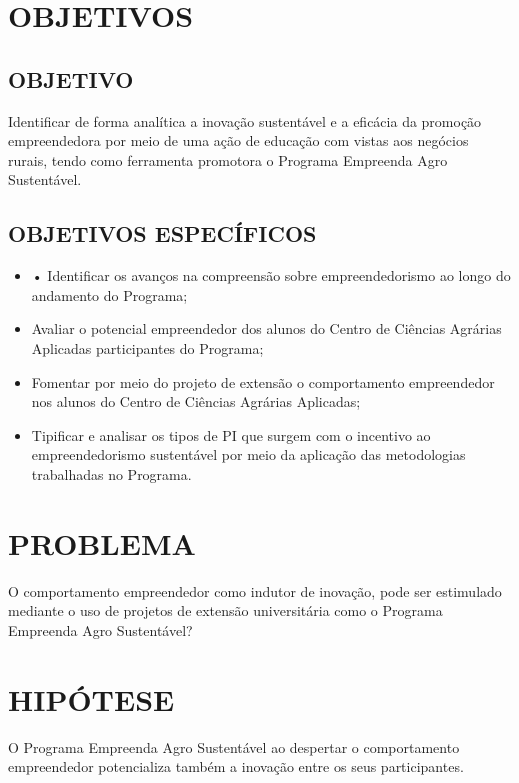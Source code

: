 \section{OBJETIVOS}

\subsection{OBJETIVO}

Identificar de forma analítica a inovação sustentável e a eficácia da promoção empreendedora por meio de uma ação de educação com vistas aos negócios rurais, tendo como ferramenta promotora o Programa Empreenda Agro Sustentável.



\subsection{OBJETIVOS ESPECÍFICOS}

\begin{itemize}
\item{•	Identificar os avanços na compreensão sobre empreendedorismo ao longo do andamento do Programa;}
\item {Avaliar o potencial empreendedor dos alunos do Centro de Ciências Agrárias Aplicadas participantes do Programa;
}
\item {Fomentar por meio do projeto de extensão o comportamento empreendedor nos alunos do Centro de Ciências Agrárias Aplicadas;}

\item {Tipificar e analisar os tipos de PI que surgem com o incentivo ao empreendedorismo sustentável por meio da aplicação das metodologias trabalhadas no Programa.}

\end{itemize}


\section{PROBLEMA}

O comportamento empreendedor como indutor de inovação, pode ser estimulado mediante o uso de projetos de extensão universitária como o Programa Empreenda Agro Sustentável? 


\section{HIPÓTESE}

O Programa Empreenda Agro Sustentável ao despertar o comportamento empreendedor potencializa também a inovação entre os seus participantes.




